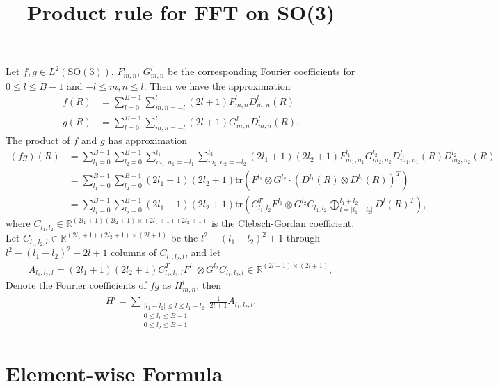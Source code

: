\documentclass[12pt]{article}
\title{\vspace{-4ex}\textbf{Product rule for FFT on SO(3)\vspace{-4ex}}}
\date{}
\newcommand{\SO}{\ensuremath{\mathrm{SO}(3)}}
\newcommand{\tr}[1]{\ensuremath{\mathrm{tr}\left( #1 \right)}}
\newcommand{\abs}[1]{\ensuremath{\left| #1 \right|}}
\newcommand{\real}{\ensuremath{\mathbb{R}}}
\begin{document}
\maketitle

Let $f,g\in L^2(\SO)$, $F_{m,n}^l$, $G_{m,n}^l$ be the corresponding Fourier coefficients for $0\leq l \leq B-1$ and $-l\leq m,n\leq l$.
Then we have the approximation
\begin{align*}
	f(R) &= \sum_{l=0}^{B-1} \sum_{m,n=-l}^l (2l+1) F_{m,n}^l D_{m,n}^l(R) \\
	g(R) &= \sum_{l=0}^{B-1} \sum_{m,n=-l}^l (2l+1) G_{m,n}^l D_{m,n}^l(R).
\end{align*}
The product of $f$ and $g$ has approximation
\begin{align*}
	(fg)(R) &= \sum_{l_1=0}^{B-1} \sum_{l_2=0}^{B-1} \sum_{m_1,n_1=-l_1}^{l_1} \sum_{m_2,n_2=-l_2}^{l_2} (2l_1+1)(2l_2+1) F_{m_1,n_1}^{l_1} G_{m_2,n_2}^{l_2} D_{m_1,n_1}^{l_1}(R) D_{m_2,n_2}^{l_2}(R) \\
	&= \sum_{l_1=0}^{B-1} \sum_{l_2=0}^{B-1} (2l_1+1)(2l_2+1) \tr{F^{l_1} \otimes G^{l_2} \cdot \left(D^{l_1}(R) \otimes D^{l_2}(R)\right)^T} \\
	&= \sum_{l_1=0}^{B-1} \sum_{l_2=0}^{B-1} (2l_1+1)(2l_2+1) \tr{C_{l_1,l_2}^T F^{l_1} \otimes G^{l_2} C_{l_1,l_2} \bigoplus_{l=\abs{l_1-l_2}}^{l_1+l_2} D^l(R)^T},
\end{align*}
where $C_{l_1,l_2} \in \real^{(2l_1+1)(2l_2+1) \times (2l_1+1)(2l_2+1)}$ is the Clebsch-Gordan coefficient. 
Let $C_{l_1,l_2,l} \in \real^{(2l_1+1)(2l_2+1) \times (2l+1)}$ be the $l^2-(l_1-l_2)^2+1$ through $l^2-(l_1-l_2)^2+2l+1$ columns of $C_{l_1,l_2,l}$, and let
\begin{align*}
	A_{l_1,l_2,l} = (2l_1+1)(2l_2+1) C_{l_1,l_2,l}^T F^{l_1} \otimes G^{l_2} C_{l_1,l_2,l} \in \real^{(2l+1) \times (2l+1)},
\end{align*}
Denote the Fourier coefficients of $fg$ as $H_{m,n}^l$, then
\begin{align*}
	H^l = \sum_{\substack{\abs{l_1-l_2} \leq l \leq l_1+l_2 \\ 0 \leq l_1 \leq B-1 \\ 0 \leq l_2 \leq B-1}} \frac{1}{2l+1} A_{l_1,l_2,l}.
\end{align*}

\section{Element-wise Formula}
\end{document}
